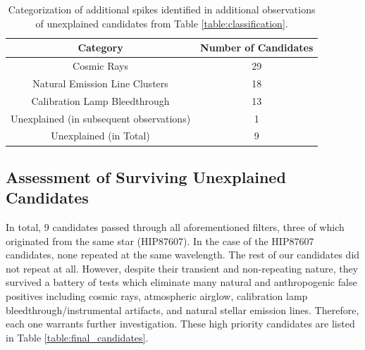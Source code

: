 \documentclass[linenumbers]{aastex631}
\begin{document}
\begin{table}
\begin{center}
\begin{tabular}{|c|c|} 
 \hline
 Category & Number of Candidates \\ 
 \hline
 Cosmic Rays & 29 \\ 
 Natural Emission Line Clusters & 18 \\ 
 Calibration Lamp Bleedthrough &  13 \\ 
 Unexplained (in subsequent observations) & 1 \\
 Unexplained (in Total) & 9 \\
 \hline
 \end{tabular}
\end{center}

\caption{Categorization of additional spikes identified in additional observations of unexplained candidates from Table \ref{table:classification}.}
\label{table:followup}
\end{table}

\subsection{Assessment of Surviving Unexplained Candidates}
\label{s:unexplained}
In total, 9 candidates passed through all aforementioned filters, three of which originated from the same star (HIP87607). In the case of the HIP87607 candidates, none repeated at the same wavelength. The rest of our candidates did not repeat at all. However, despite their transient and non-repeating nature, they survived a battery of tests which eliminate many natural and anthropogenic false positives including cosmic rays, atmospheric airglow, calibration lamp bleedthrough/instrumental artifacts, and natural stellar emission lines. Therefore, each one warrants further investigation.  These high priority candidates are listed in Table \ref{table:final_candidates}.
\end{document}
